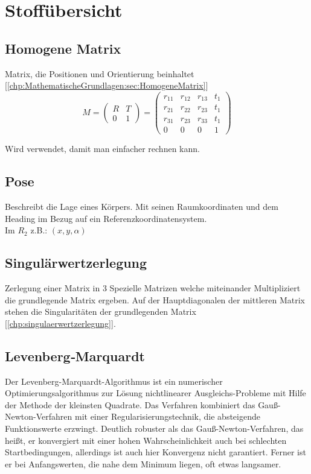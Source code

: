 \chapter{Stoffübersicht}
\label{chp:stoffübersicht}

\section{Homogene Matrix}	
\label{chp:stoffübersicht:sec:homogeneMatrix}
Matrix, die Positionen und Orientierung beinhaltet [\ref{chp:MathematischeGrundlagen:sec:HomogeneMatrix}]
\begin{equation}
M = 
\left(
\begin{array}{cc}
R & T\\
0 & 1
\end{array}
\right)
=
\left(
\begin{array}{cccc}
r_{11} & r_{12} & r_{13} & t_{1} \\
r_{21} & r_{22} & r_{23} & t_{1} \\
r_{31} & r_{23} & r_{33} & t_{1} \\
0 	   & 0    & 0    & 1  
\end{array}
\right)	
\end{equation}

Wird verwendet, damit man einfacher rechnen kann.

\section{Pose}	
\label{chp:stoffübersicht:sec:pose}
Beschreibt die Lage eines Körpers. Mit seinen Raumkoordinaten und dem Heading im Bezug auf ein Referenzkoordinatensystem. \\
Im $R_2$ z.B.: $(x, y, \alpha)$

\section{Singulärwertzerlegung}	
\label{chp:stoffübersicht:sec:singulärwertzerlegung}
Zerlegung einer Matrix in 3 Spezielle Matrizen welche miteinander Multipliziert die grundlegende Matrix ergeben. Auf der Hauptdiagonalen der mittleren Matrix stehen die Singularitäten der grundlegenden Matrix [\ref{chp:singulaerwertzerlegung}]. 

\section{Levenberg‐Marquardt}
\label{chp:stoffübersicht:sec:Levenberg‐Marquardt}
Der Levenberg-Marquardt-Algorithmus ist ein numerischer Optimierungsalgorithmus zur Lösung nichtlinearer Ausgleichs-Probleme mit
Hilfe der Methode der kleinsten Quadrate. Das Verfahren kombiniert das Gauß-Newton-Verfahren mit einer Regularisierungstechnik, die
absteigende Funktionswerte erzwingt. Deutlich robuster als das Gauß-Newton-Verfahren, das heißt, er konvergiert mit einer hohen
Wahrscheinlichkeit auch bei schlechten Startbedingungen, allerdings ist auch hier Konvergenz nicht garantiert. Ferner ist er bei
Anfangswerten, die nahe dem Minimum liegen, oft etwas langsamer. 

